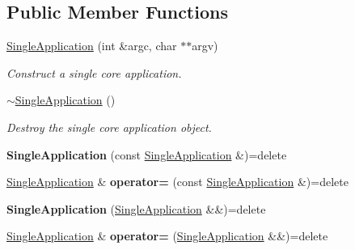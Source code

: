 \subsection*{Public Member Functions}
\begin{DoxyCompactItemize}
\item 
\hyperlink{class_mdt_1_1_single_application_a481cd7bad65a75dd891ca33cb80c82c5}{Single\+Application} (int \&argc, char $\ast$$\ast$argv)
\begin{DoxyCompactList}\small\item\em Construct a single core application. \end{DoxyCompactList}\item 
\hyperlink{class_mdt_1_1_single_application_a49ff3421ee835333c6ebc00e8cdbf7ba}{$\sim$\+Single\+Application} ()
\begin{DoxyCompactList}\small\item\em Destroy the single core application object. \end{DoxyCompactList}\item 
{\bfseries Single\+Application} (const \hyperlink{class_mdt_1_1_single_application}{Single\+Application} \&)=delete\hypertarget{class_mdt_1_1_single_application_a95057dbd755f25858cde0b6fe7b1caf3}{}\label{class_mdt_1_1_single_application_a95057dbd755f25858cde0b6fe7b1caf3}

\item 
\hyperlink{class_mdt_1_1_single_application}{Single\+Application} \& {\bfseries operator=} (const \hyperlink{class_mdt_1_1_single_application}{Single\+Application} \&)=delete\hypertarget{class_mdt_1_1_single_application_a4af78f4ca92387c6d2db5c2a81ccb53a}{}\label{class_mdt_1_1_single_application_a4af78f4ca92387c6d2db5c2a81ccb53a}

\item 
{\bfseries Single\+Application} (\hyperlink{class_mdt_1_1_single_application}{Single\+Application} \&\&)=delete\hypertarget{class_mdt_1_1_single_application_afbcbe0f5d302e5885d6f2e009f83ac53}{}\label{class_mdt_1_1_single_application_afbcbe0f5d302e5885d6f2e009f83ac53}

\item 
\hyperlink{class_mdt_1_1_single_application}{Single\+Application} \& {\bfseries operator=} (\hyperlink{class_mdt_1_1_single_application}{Single\+Application} \&\&)=delete\hypertarget{class_mdt_1_1_single_application_abab934e52b0548c07aca04576418d994}{}\label{class_mdt_1_1_single_application_abab934e52b0548c07aca04576418d994}


\end{DoxyCompactItemize}
